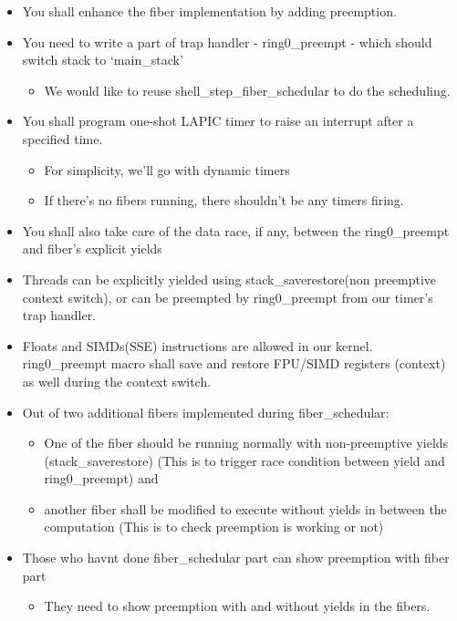 \documentclass[]{book}
\begin{document}
\begin{itemize}
\itemsep1pt\parskip0pt
\item
  You shall enhance the fiber implementation by adding preemption.
\item
  You need to write a part of trap handler - ring0\_preempt - which
  should switch stack to `main\_stack'

  \begin{itemize}
  \itemsep1pt\parskip0pt
  \item
    We would like to reuse shell\_step\_fiber\_schedular to do the
    scheduling.
  \end{itemize}
\item
  You shall program one-shot LAPIC timer to raise an interrupt after a
  specified time.

  \begin{itemize}
  \itemsep1pt\parskip0pt
  \item
    For simplicity, we'll go with dynamic timers
  \item
    If there's no fibers running, there shouldn't be any timers firing.
  \end{itemize}
\item
  You shall also take care of the data race, if any, between the
  ring0\_preempt and fiber's explicit yields
\item
  Threads can be explicitly yielded using stack\_saverestore(non
  preemptive context switch), or can be preempted by ring0\_preempt from
  our timer's trap handler.
\item
  Floats and SIMDs(SSE) instructions are allowed in our kernel.
  ring0\_preempt macro shall save and restore FPU/SIMD registers
  (context) as well during the context switch.
\item
  Out of two additional fibers implemented during fiber\_schedular:

  \begin{itemize}
  \itemsep1pt\parskip0pt
  \item
    One of the fiber should be running normally with non-preemptive
    yields (stack\_saverestore) (This is to trigger race condition
    between yield and ring0\_preempt) and
  \item
    another fiber shall be modified to execute without yields in between
    the computation (This is to check preemption is working or not)
  \end{itemize}
\item
  Those who havnt done fiber\_schedular part can show preemption with
  fiber part

  \begin{itemize}
  \itemsep1pt\parskip0pt
  \item
    They need to show preemption with and without yields in the fibers.
  \end{itemize}
\end{itemize}
\end{document}
